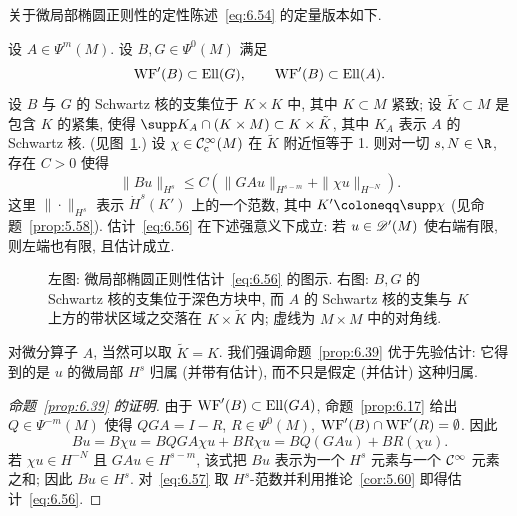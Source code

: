 关于微局部椭圆正则性的定性陈述~\eqref{eq:6.54} 的定量版本如下.

\begin{proposition}[微局部椭圆正则性估计]\label{prop:6.39}
设 $A \in \Psi^m(M)$. 设 $B, G \in \Psi^0(M)$ 满足
\begin{equation}\label{eq:6.55}
    \operatorname{WF}'(B) \subset \operatorname{Ell}(G), \qquad \operatorname{WF}'(B) \subset \operatorname{Ell}(A).
\end{equation}
设 $B$ 与 $G$ 的 Schwartz 核的支集位于 $K \times K$ 中, 其中 $K \subset M$ 紧致; 设 $\tilde{K} \subset M$ 是包含 $K$ 的紧集, 使得 $\supp K_A \cap (K \times M) \subset K \times \tilde{K}$, 其中 $K_A$ 表示 $A$ 的 Schwartz 核. (见图~\ref{fig:6.3}.) 设 $\chi \in \mathcal{C}_{\mathrm{c}}^\infty(M)$ 在 $\tilde{K}$ 附近恒等于 1. 则对一切 $s, N \in \R$, 存在 $C > 0$ 使得
\begin{equation}\label{eq:6.56}
    \|B u\|_{H^s} \le C \left( \|G A u\|_{H^{s-m}} + \|\chi u\|_{H^{-N}} \right).
\end{equation}
这里 $\|\cdot\|_{H^s}$ 表示 $\dot{H}^s(K')$ 上的一个范数, 其中 $K' \defeq \supp \chi$ (见命题~\ref{prop:5.58}). 估计~\eqref{eq:6.56} 在下述强意义下成立: 若 $u \in \mathscr{D}'(M)$ 使右端有限, 则左端也有限, 且估计成立.
\end{proposition}

\begin{figure}[htbp]
\centering
\drawFigSixThree
\caption{左图: 微局部椭圆正则性估计~\eqref{eq:6.56} 的图示. 右图: $B, G$ 的 Schwartz 核的支集位于深色方块中, 而 $A$ 的 Schwartz 核的支集与 $K$ 上方的带状区域之交落在 $K \times \tilde{K}$ 内; 虚线为 $M \times M$ 中的对角线.}
\label{fig:6.3}
\end{figure}

对微分算子 $A$, 当然可以取 $\tilde{K} = K$. 我们强调命题~\ref{prop:6.39} 优于先验估计: 它得到的是 $u$ 的微局部 $H^s$ 归属 (并带有估计), 而不只是假定 (并估计) 这种归属.

\begin{proof}[命题~\ref{prop:6.39} 的证明]
由于 $\operatorname{WF}'(B) \subset \operatorname{Ell}(G A)$, 命题~\ref{prop:6.17} 给出 $Q \in \Psi^{-m}(M)$ 使得 $Q G A = I - R$, $R \in \Psi^0(M)$, $\operatorname{WF}'(B) \cap \operatorname{WF}'(R) = \emptyset$. 因此
\begin{equation}\label{eq:6.57}
    B u = B \chi u = B Q G A \chi u + B R \chi u = B Q (G A u) + B R (\chi u).
\end{equation}
若 $\chi u \in H^{-N}$ 且 $G A u \in H^{s-m}$, 该式把 $B u$ 表示为一个 $H^s$ 元素与一个 $\mathcal{C}^\infty$ 元素之和; 因此 $B u \in H^s$. 对~\eqref{eq:6.57} 取 $H^s$-范数并利用推论~\ref{cor:5.60} 即得估计~\eqref{eq:6.56}.
\end{proof}

